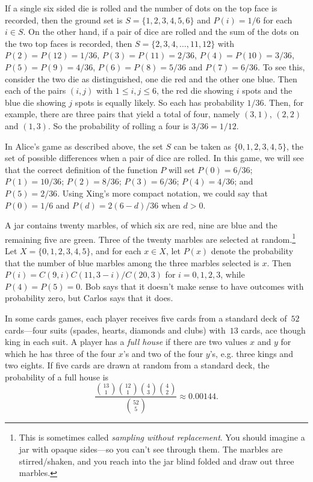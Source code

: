 \begin{example}
If a single six sided die is rolled and the number of dots on the
top face is recorded, then the ground set is $S=\{1,2,3,4,5,6\}$ and
$P(i)=1/6$ for each $i\in S$.  On the other hand, if a pair of dice
are rolled and the sum of the dots on the two top faces is recorded,
then $S=\{2,3,4,\dots,11,12\}$ with $P(2)=P(12) =1/36$, $P(3)=P(11)=2/36$,
$P(4)=P(10)=3/36$, $P(5)=P(9)=4/36$, $P(6)=P(8)=5/36$ and $P(7)=6/36$.
To see this, consider the two die as distinguished, one die red and the
other one blue.  Then each of the pairs $(i,j)$ with $1\le i,j\le 6$, 
the red die showing $i$ spots and the blue die showing $j$ spots is
equally likely.  So each has probability $1/36$.  Then, for example,
there are three pairs that yield a total of four, namely $(3,1)$, $(2,2)$
and $(1,3)$.  So the probability of rolling a four is $3/36=1/12$.
\end{example}

\begin{example}
In Alice's game as described above, the set $S$ can be taken
as $\{0,1,2,3,4,5\}$, the set of possible differences when a pair
of dice are rolled.  In this game, we will see that the correct
definition of the function $P$ will set $P(0)=6/36$; $P(1)=10/36$;
$P(2)=8/36$; $P(3)=6/36$; $P(4)=4/36$; and $P(5)=2/36$.  Using
Xing's more compact notation, we could say that $P(0)=1/6$ and
$P(d)= 2(6-d)/36$ when $d>0$.
\end{example}

\begin{example}
  A jar contains twenty marbles, of which six are red, nine are blue
  and the remaining five are green.  Three of the twenty marbles are
  selected at random.\footnote{This is sometimes called
    \textit{sampling without replacement}.  You should imagine a jar
    with opaque sides---so you can't see through them.  The marbles
    are stirred/shaken, and you reach into the jar blind folded and
    draw out three marbles.}  Let $X=\{0,1,2,3,4,5\}$, and for each
  $x\in X$, let $P(x)$ denote the probability that the number of blue
  marbles among the three marbles selected is $x$.  Then
  $P(i)=C(9,i)C(11,3-i)/C(20,3)$ for $i=0,1,2,3$, while $P(4)=P(5)=0$.
  Bob says that it doesn't make sense to have outcomes with
  probability zero, but Carlos says that it does.
\end{example}

\begin{example}
In some cards games, each player receives five cards from a
standard deck of~$52$ cards---four suits (spades, hearts, diamonds
and clubs) with~$13$ cards, ace though king in each suit.  A player 
has a \textit{full house} if there are two values $x$ and $y$ for
which he has three of the four $x$'s and two of the four $y$'s, e.g.
three kings and two eights.  If five cards are drawn at random from
a standard deck, the probability of a full house is 
\[
\frac{\binom{13}{1}\binom{12}{1}\binom{4}{3}\binom{4}{2}}{\binom{52}{5}}\approx 0.00144.
\]
\end{example}

